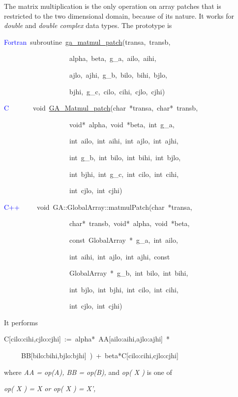 The matrix multiplication is the only operation on array patches that
is restricted to the two dimensional domain, because of its nature.
It works for\emph{ double} and \emph{double complex} data types. The
prototype is
\begin{lyxcode}
\textcolor{blue}{Fortran}~subroutine~\href{http://www.emsl.pnl.gov/docs/global/ga_ops.html\#ga_matmul_patch}{ga\_{}matmul\_{}patch}(transa,~transb,~

~~~~~~~~~~~~~~~~~~~alpha,~beta,~g\_a,~ailo,~aihi,~

~~~~~~~~~~~~~~~~~~~ajlo,~ajhi,~g\_b,~bilo,~bihi,~bjlo,~

~~~~~~~~~~~~~~~~~~~bjhi,~g\_c,~cilo,~cihi,~cjlo,~cjhi)~

\textcolor{blue}{C}~~~~~~~void~\href{http://www.emsl.pnl.gov/docs/global/c_nga_ops.html\#ga_matmul_patch}{GA\_{}Matmul\_{}patch}(char~{*}transa,~char{*}~transb,

~~~~~~~~~~~~~~~~~~~void{*}~alpha,~void~{*}beta,~int~g\_a,~

~~~~~~~~~~~~~~~~~~~int~ailo,~int~aihi,~int~ajlo,~int~ajhi,~

~~~~~~~~~~~~~~~~~~~int~g\_b,~int~bilo,~int~bihi,~int~bjlo,~

~~~~~~~~~~~~~~~~~~~int~bjhi,~int~g\_c,~int~cilo,~int~cihi,~

~~~~~~~~~~~~~~~~~~~int~cjlo,~int~cjhi)~

\textcolor{blue}{C++}~~~~~void~GA::GlobalArray::matmulPatch(char~{*}transa,

~~~~~~~~~~~~~~~~~~~char{*}~transb,~void{*}~alpha,~void~{*}beta,~

~~~~~~~~~~~~~~~~~~~const~GlobalArray~{*}~g\_a,~int~ailo,~

~~~~~~~~~~~~~~~~~~~int~aihi,~int~ajlo,~int~ajhi,~const~

~~~~~~~~~~~~~~~~~~~GlobalArray~{*}~g\_b,~int~bilo,~int~bihi,~

~~~~~~~~~~~~~~~~~~~int~bjlo,~int~bjhi,~int~cilo,~int~cihi,~

~~~~~~~~~~~~~~~~~~~int~cjlo,~int~cjhi)
\end{lyxcode}
It performs
\begin{lyxcode}
C{[}cilo:cihi,cjlo:cjhi{]}~:=~alpha{*}~AA{[}ailo:aihi,ajlo:ajhi{]}~{*}

~~~~~BB{[}bilo:bihi,bjlo:bjhi{]}~)~+~beta{*}C{[}cilo:cihi,cjlo:cjhi{]}
\end{lyxcode}
where \emph{AA = op(A), BB = op(B),} and \emph{op( X )} is one of

\emph{op( X ) = X or op( X ) = X',}

